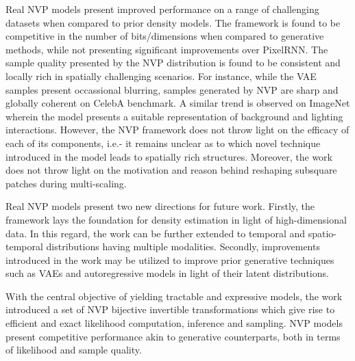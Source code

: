 \documentclass[11pt,letterpaper]{article}
\begin{document}
Real NVP models present improved performance on a range of challenging datasets when compared to prior density models. The framework is found to be competitive in the number of bits/dimensions when compared to generative methods, while not presenting significant improvements over PixelRNN. The sample quality presented by the NVP distribution is found to be consistent and locally rich in spatially challenging scenarios. For instance, while the VAE samples present occassional blurring, samples generated by NVP are sharp and globally coherent on CelebA benchmark. A similar trend is observed on ImageNet wherein the model presents a suitable representation of background and lighting interactions. However, the NVP framework does not throw light on the efficacy of each of its components, i.e.- it remains unclear as to which novel technique introduced in the model leads to spatially rich structures. Moreover, the work does not throw light on the motivation and reason behind reshaping subsquare patches during multi-scaling.

Real NVP models present two new directions for future work. Firstly, the framework lays the foundation for density estimation in light of high-dimensional data. In this regard, the work can be further extended to temporal and spatio-temporal distributions having multiple modalities. Secondly, improvements introduced in the work may be utilized to improve prior generative techniques such as VAEs and autoregressive models in light of their latent distributions. 

With the central objective of yielding tractable and expressive models, the work introduced a set of NVP bijective invertible transformations which give rise to efficient and exact likelihood computation, inference and sampling. NVP models present competitive performance akin to generative counterparts, both in terms of likelihood and sample quality.
\end{document}
